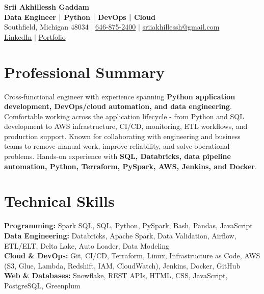 \documentclass[letterpaper,10pt]{article}
\begin{document}
\fontsize{9.35pt}{10.45pt}\selectfont

\begin{center}
    {\LARGE \textbf{Srii Akhillessh Gaddam}} \\[-1pt]
    \textbf{Data Engineer | Python | DevOps | Cloud} \\[2pt]
    Southfield, Michigan 48034 $|$
    \href{tel:6468752400}{646-875-2400} $|$
    \href{mailto:sriiakhillessh@gmail.com}{sriiakhillessh@gmail.com} \\[1pt]
    \href{https://www.linkedin.com/in/srii-akhiilessh-gaddam-b48668191/}{LinkedIn} $|$
    \href{https://sriiakhillesshg.github.io/portfolio/}{Portfolio}
\end{center}
\vspace{-8pt}

\section{Professional Summary}
\small{Cross-functional engineer with experience spanning \textbf{Python application development, DevOps/cloud automation, and data engineering}. Comfortable working across the application lifecycle - from Python and SQL development to AWS infrastructure, CI/CD, monitoring, ETL workflows, and production support. Known for collaborating with engineering and business teams to remove manual work, improve reliability, and solve operational problems. Hands-on experience with \textbf{SQL, Databricks, data pipeline automation, Python, Terraform, PySpark, AWS, Jenkins, and Docker}.}

\section{Technical Skills}
\small{
\textbf{Programming:} Spark SQL, SQL, Python, PySpark, Bash, Pandas, JavaScript \\
\textbf{Data Engineering:} Databricks, Apache Spark, Data Validation, Airflow, ETL/ELT, Delta Lake, Auto Loader, Data Modeling \\
\textbf{Cloud \& DevOps:} Git, CI/CD, Terraform, Linux, Infrastructure as Code, AWS (S3, Glue, Lambda, Redshift, IAM, CloudWatch), Jenkins, Docker, GitHub \\
\textbf{Web \& Databases:} Snowflake, REST APIs, HTML, CSS, JavaScript, PostgreSQL, Greenplum
}
\end{document}
